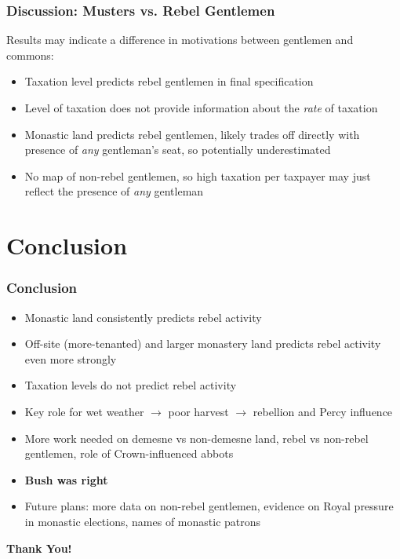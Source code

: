 \documentclass{beamer}
\begin{document}
    \begin{frame}
        \frametitle{Discussion: Musters vs. Rebel Gentlemen}
        Results may indicate a difference in motivations between gentlemen and commons:
        \begin{itemize}
            \item Taxation level predicts rebel gentlemen in final specification
            \item Level of taxation does not provide information about the \emph{rate} of taxation
            \item Monastic land predicts rebel gentlemen, likely trades off directly with presence of \emph{any} gentleman's seat, so potentially underestimated
            \item No map of non-rebel gentlemen, so high taxation per taxpayer may just reflect the presence of \emph{any} gentleman
        \end{itemize}
        
    \end{frame}
    \section{Conclusion}
    \begin{frame}
        \frametitle{Conclusion}
        \begin{itemize}
            \item Monastic land consistently predicts rebel activity
            \item Off-site (more-tenanted) and larger monastery land predicts rebel activity even more strongly
            \item Taxation levels do not predict rebel activity
            \item Key role for wet weather $\rightarrow$ poor harvest $\rightarrow$ rebellion and Percy influence
            \item More work needed on demesne vs non-demesne land, rebel vs non-rebel gentlemen, role of Crown-influenced abbots
            \item \textbf{Bush was right}
            \item Future plans: more data on non-rebel gentlemen, evidence on Royal pressure in monastic elections, names of monastic patrons
        \end{itemize}
        
    \end{frame}

    \begin{frame}{}
        \centering
        \Huge
        \textbf{Thank You!}
    \end{frame}
\end{document}
